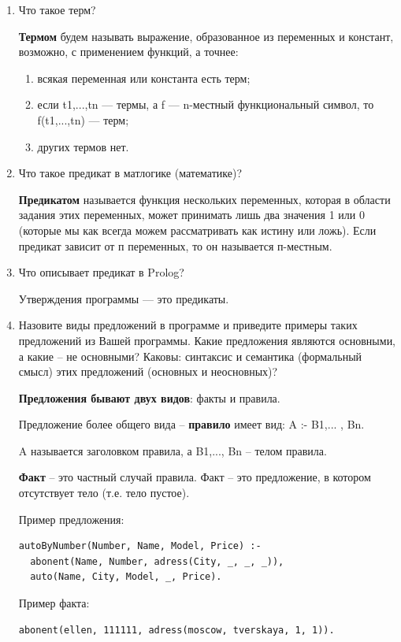\documentclass[a4paper,14pt]{extreport} %
\begin{document}
\begin{enumerate}
\item Что такое терм?

\textbf{Термом} будем называть выражение, образованное из переменных и констант, возможно, с применением функций, а точнее:
\begin{enumerate}
\item всякая переменная или константа есть терм;
\item если t1,...,tn — термы, а f — n-местный функциональный символ,
то f(t1,...,tn) — терм;
\item других термов нет.

\end{enumerate}
\item Что такое предикат в матлогике (математике)?

\textbf{Предикатом} называется функция нескольких переменных, которая в области задания этих переменных, может принимать лишь два значения 1 или 0 (которые мы как всегда можем рассматривать как истину или ложь).
Если предикат зависит от п переменных, то он называется п-местным.

\item Что описывает предикат в Prolog?

Утверждения программы — это предикаты. 

\item Назовите виды предложений в программе и приведите примеры таких предложений из Вашей программы. Какие предложения являются основными, а какие – не основными?  Каковы: синтаксис и семантика (формальный смысл) этих предложений (основных и неосновных)?

\textbf{Предложения бывают двух видов}: факты и правила. 

Предложение более общего вида -- \textbf{правило} имеет вид:
	A :- B1,... , Bn. 

A называется заголовком правила, а B1,..., Bn -- телом правила.

\textbf{Факт} -- это частный случай правила. Факт -- это предложение, в котором отсутствует тело (т.е. тело пустое). 

Пример предложения:
\begin{lstlisting}
autoByNumber(Number, Name, Model, Price) :- 
  abonent(Name, Number, adress(City, _, _, _)),
  auto(Name, City, Model, _, Price).
\end{lstlisting}

Пример факта:
\begin{lstlisting}
abonent(ellen, 111111, adress(moscow, tverskaya, 1, 1)).
\end{lstlisting}


\end{enumerate}
\end{document}
